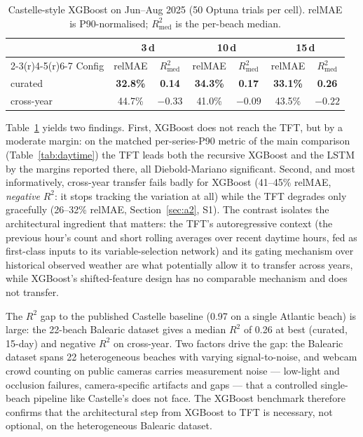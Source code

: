 \documentclass[twocolumn,twoside,a4paper,10pt]{IEEEtran}
\begin{document}
\begin{table}[!t]
    \caption{Castelle-style XGBoost on Jun--Aug 2025 (50 Optuna trials per cell). relMAE is P90-normalised; $R^2_\text{med}$ is the per-beach median.}
    \label{tab:c2}
    \begin{center}
    \footnotesize
    \setlength{\tabcolsep}{4pt}
    \begin{tabular}{lcccccc}
        \toprule
        & \multicolumn{2}{c}{3\,d} & \multicolumn{2}{c}{10\,d} & \multicolumn{2}{c}{15\,d} \\
        \cmidrule(r){2-3}\cmidrule(r){4-5}\cmidrule(r){6-7}
        Config & relMAE & $R^2_\text{med}$ & relMAE & $R^2_\text{med}$ & relMAE & $R^2_\text{med}$ \\
        \midrule
        curated    & \textbf{32.8\%} & \textbf{0.14} & \textbf{34.3\%} & \textbf{0.17} & \textbf{33.1\%} & \textbf{0.26} \\
        cross-year & 44.7\% & $-0.33$ & 41.0\% & $-0.09$ & 43.5\% & $-0.22$ \\
        \bottomrule
    \end{tabular}
    \end{center}
\end{table}

Table~\ref{tab:c2} yields two findings. First, XGBoost does not reach the TFT, but by a moderate margin: on the matched per-series-P90 metric of the main comparison (Table~\ref{tab:daytime}) the TFT leads both the recursive XGBoost and the LSTM by the margins reported there, all Diebold-Mariano significant. Second, and most informatively, cross-year transfer fails badly for XGBoost (41--45\% relMAE, \emph{negative} $R^2$: it stops tracking the variation at all) while the TFT degrades only gracefully (26--32\% relMAE, Section~\ref{sec:a2}, S1). The contrast isolates the architectural ingredient that matters: the TFT's autoregressive context (the previous hour's count and short rolling averages over recent daytime hours, fed as first-class inputs to its variable-selection network) and its gating mechanism over historical observed weather are what potentially allow it to transfer across years, while XGBoost's shifted-feature design has no comparable mechanism and does not transfer.

The $R^2$ gap to the published Castelle baseline (0.97 on a single Atlantic beach) is large: the 22-beach Balearic dataset gives a median $R^2$ of 0.26 at best (curated, 15-day) and negative $R^2$ on cross-year. Two factors drive the gap: the Balearic dataset spans 22 heterogeneous beaches with varying signal-to-noise, and webcam crowd counting on public cameras carries measurement noise --- low-light and occlusion failures, camera-specific artifacts and gaps --- that a controlled single-beach pipeline like Castelle's does not face. The XGBoost benchmark therefore confirms that the architectural step from XGBoost to TFT is necessary, not optional, on the heterogeneous Balearic dataset.
\end{document}
